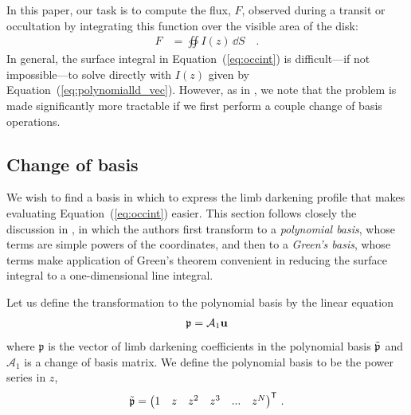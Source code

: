\documentclass[modern,trackchanges]{aastex63}
\begin{document}
In this paper, our task is to compute the flux, $F$, observed during a transit or occultation by
integrating this function over the visible area of the disk:
%
\begin{align}
    \label{eq:occint}
    F &=
    \oiint I(z) \, \dd S \quad .
\end{align}
%
In general, the surface integral in Equation~(\ref{eq:occint}) is difficult---if not
impossible---to solve directly with $I(z)$ given by Equation~(\ref{eq:polynomialld_vec}).
However, as in \citet{starry}, we note that the problem
is made significantly more tractable if we first perform a couple change of basis
operations.

\subsection{Change of basis}
\label{sec:change_of_basis}
We wish to find a basis in which to express the limb darkening profile that
makes evaluating Equation~(\ref{eq:occint}) easier. This section follows
closely the discussion in \citet{starry}, in which the authors first transform
to a \emph{polynomial basis}, whose terms are simple powers of the coordinates,
and then to a \emph{Green's basis}, whose terms make application of Green's
theorem convenient in reducing the surface integral to a one-dimensional line
integral.

Let us define the transformation to the polynomial basis by the linear equation
%
\begin{align}
    \label{eq:pbasis}
    \mathfrak{p} = \mathcal{A}_1 {\mathbf{u}}
\end{align}
%
where $\mathfrak{p}$ is the vector of limb darkening coefficients in the
polynomial basis $\tilde{\mathfrak{p}}$ and $\mathcal{A}_1$ is a change of basis matrix.
We define the polynomial basis to be the power series in $z$,
%
\begin{align}
    \label{eq:polybasis}
    \pbasis = \begin{pmatrix}
        1 & z & z^2 & z^3 & ... & z^N
    \end{pmatrix}^\mathsf{T} \quad.
\end{align}
%

\end{document}
